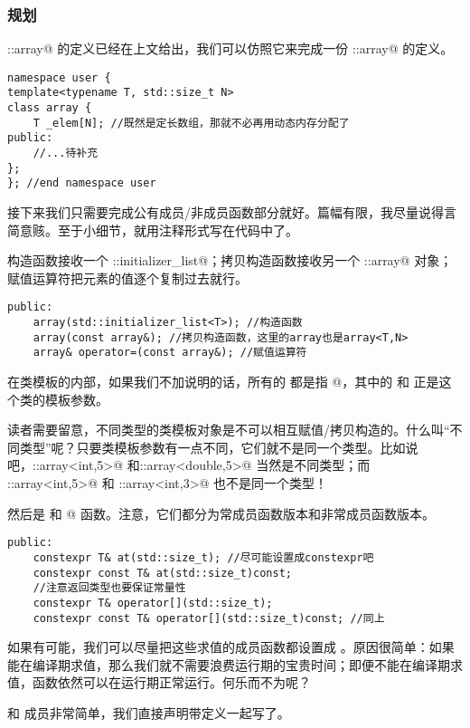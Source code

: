 \subsubsection*{规划}
\lstinline@std::array@ 的定义已经在上文给出，我们可以仿照它来完成一份 \lstinline@user::array@ 的定义。
\begin{lstlisting}
namespace user {
template<typename T, std::size_t N>
class array {
    T _elem[N]; //既然是定长数组，那就不必再用动态内存分配了
public:
    //...待补充
};
}; //end namespace user
\end{lstlisting}
接下来我们只需要完成公有成员/非成员函数部分就好。篇幅有限，我尽量说得言简意赅。至于小细节，就用注释形式写在代码中了。\par
构造函数接收一个 \lstinline@std::initializer_list@；拷贝构造函数接收另一个 \lstinline@user::array@ 对象；赋值运算符把元素的值逐个复制过去就行。
\begin{lstlisting}
public:
    array(std::initializer_list<T>); //构造函数
    array(const array&); //拷贝构造函数，这里的array也是array<T,N>
    array& operator=(const array&); //赋值运算符
\end{lstlisting}
在类模板的内部，如果我们不加说明的话，所有的 \lstinline@array@ 都是指 @，其中的 \lstinline@T@ 和 \lstinline@N@ 正是这个类的模板参数。\par
读者需要留意，不同类型的类模板对象是不可以相互赋值/拷贝构造的。什么叫``不同类型''呢？只要类模板参数有一点不同，它们就不是同一个类型。比如说吧，\lstinline@user::array<int,5>@ 和\newline\lstinline@user::array<double,5>@ 当然是不同类型；而 \lstinline@user::array<int,5>@ 和 \lstinline@user::array<int,3>@ 也不是同一个类型！\par
然后是 \lstinline@at@ 和 \lstinline@operator[]@ 函数。注意，它们都分为常成员函数版本和非常成员函数版本。
\begin{lstlisting}
public:
    constexpr T& at(std::size_t); //尽可能设置成constexpr吧
    constexpr const T& at(std::size_t)const;
    //注意返回类型也要保证常量性
    constexpr T& operator[](std::size_t);
    constexpr const T& operator[](std::size_t)const; //同上
\end{lstlisting}
如果有可能，我们可以尽量把这些求值的成员函数都设置成 \lstinline@constexpr@。原因很简单：如果能在编译期求值，那么我们就不需要浪费运行期的宝贵时间；即便不能在编译期求值，\lstinline@constexpr@ 函数依然可以在运行期正常运行。何乐而不为呢？\par
\lstinline@front@ 和 \lstinline@back@ 成员非常简单，我们直接声明带定义一起写了。
